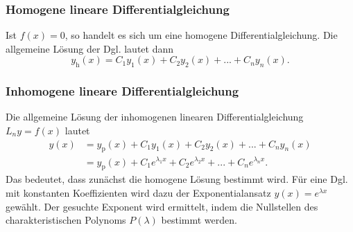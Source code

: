 \subsubsection*{Homogene lineare Differentialgleichung}
Ist $f(x) = 0$, so handelt es sich um eine homogene Differentialgleichung.
Die allgemeine L\"osung der Dgl. lautet dann
$$
y_{\text{h}}(x)= C_1  y_1(x) + C_2 y_2(x) + ... + C_n y_n(x).
$$


\subsubsection*{Inhomogene lineare Differentialgleichung}
Die allgemeine L\"osung der inhomogenen linearen Differentialgleichung $L_n y = f(x)$ lautet
\begin{align*}
y(x) & =y_{\text{p}}(x)+ C_1  y_1(x) + C_2 y_2(x) + ... + C_n y_n(x)\\
     & =y_{\text{p}}(x)+ C_1  e^{\lambda_1 x} + C_2 e^{\lambda_2 x}  + ... + C_n e^{\lambda_n x} .
\end{align*}
Das bedeutet, dass zun\"achst die homogene L\"osung bestimmt wird. F\"ur eine Dgl. mit konstanten Koeffizienten wird dazu der Exponentialansatz $y(x) = e^{\lambda x }$ gew\"ahlt. Der gesuchte Exponent wird ermittelt, indem die Nullstellen des charakteristischen Polynoms $P(\lambda)$ bestimmt werden.